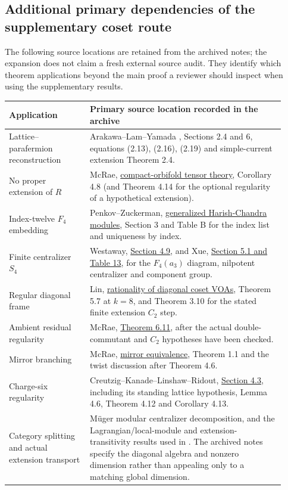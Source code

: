 \subsection{Additional primary dependencies of the supplementary coset route}

The following source locations are retained from the archived notes;
the expansion does not claim a fresh external source audit.
They identify which theorem applications beyond the main proof a
reviewer should inspect when using the supplementary results.

\begin{longtable}{@{}p{0.27\linewidth}p{0.65\linewidth}@{}}
\toprule
Application&Primary source location recorded in the archive\\
\midrule\endhead
Lattice--parafermion reconstruction&Arakawa--Lam--Yamada
\cite{ALY}, Sections 2.4 and 6, equations (2.13), (2.16), (2.19)
and simple-current extension Theorem 2.4.\\
No proper extension of $R$&McRae,
\href{https://arxiv.org/abs/1810.00747}{compact-orbifold tensor theory},
Corollary 4.8 (and Theorem 4.14 for the optional regularity of a
hypothetical extension).\\
Index-twelve $F_4$ embedding&Penkov--Zuckerman,
\href{https://math.constructor.university/penkov/papers/gen_hc_r_final.pdf}{generalized Harish-Chandra modules},
Section 3 and Table B for the index list and uniqueness by index.\\
Finite centralizer $S_4$&Westaway,
\href{https://arxiv.org/abs/2312.01838}{Section 4.9}, and Xue,
\href{https://jolt.centre-mersenne.org/item/10.5802/jolt.950.pdf}{Section 5.1 and Table 13},
for the $F_4(a_3)$ diagram, nilpotent centralizer and component group.\\
Regular diagonal frame&Lin,
\href{https://arxiv.org/abs/2107.09400}{rationality of diagonal coset VOAs},
Theorem 5.7 at $k=8$, and Theorem 3.10 for the stated finite
extension $C_2$ step.\\
Ambient residual regularity&McRae,
\href{https://arxiv.org/abs/2108.01898}{Theorem 6.11}, after the
actual double-commutant and $C_2$ hypotheses have been checked.\\
Mirror branching&McRae,
\href{https://arxiv.org/abs/2107.06577}{mirror equivalence}, Theorem 1.1
and the twist discussion after Theorem 4.6.\\
Charge-six regularity&Creutzig--Kanade--Linshaw--Ridout,
\href{https://arxiv.org/abs/1611.00305}{Section 4.3}, including its
standing lattice hypothesis, Lemma 4.6, Theorem 4.12 and
Corollary 4.13.\\
Category splitting and actual extension transport&M\"uger modular
centralizer decomposition, and the Lagrangian/local-module and
extension-transitivity results used in \cite{DMNO,Mueger,HKL}.
The archived notes specify the diagonal algebra and nonzero dimension
rather than appealing only to a matching global dimension.\\
\bottomrule
\end{longtable}
